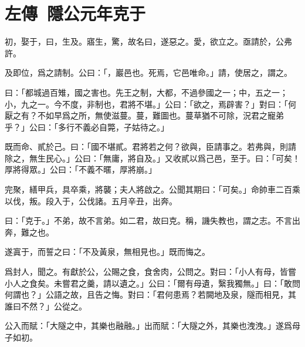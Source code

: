 \section[鄭伯克段于鄢\quad{\small 左傳\ 隱公元年}]{{\normalsize 左傳\ 隱公元年}\quad {}克于}
初，娶于，曰，生及。寤生，驚，故名曰，遂惡之。愛，欲立之。亟請於，公弗許。

及即位，爲之請制。公曰：「，巖邑也。死焉，它邑唯命。」請，使居之，謂之。

曰：「都城過百雉，國之害也。先王之制，大都，不過參國之一；中，五之一；小，九之一。今不度，非制也，君將不堪。」公曰：「欲之，焉辟害？」對曰：「何厭之有？不如早爲之所，無使滋蔓。蔓，難圖也。蔓草猶不可除，況君之寵弟乎？」公曰：「多行不義必自斃，子姑待之。」

既而命、貳於己。曰：「國不堪貳。君將若之何？欲與，臣請事之。若弗與，則請除之，無生民心。」公曰：「無庸，將自及。」又收貳以爲己邑，至于。曰：「可矣！厚將得眾。」公曰：「不義不暱，厚將崩。」

完聚，繕甲兵，具卒乘，將襲；夫人將啟之。公聞其期曰：「可矣。」命帥車二百乘以伐，叛。段入于，公伐諸。五月辛丑，出奔。

曰：「克于。」不弟，故不言弟。如二君，故曰克。稱，譏失教也，謂之志。不言出奔，難之也。

遂寘于，而誓之曰：「不及黃泉，無相見也。」既而悔之。

爲封人，聞之。有獻於公，公賜之食，食舍肉，公問之。對曰：「小人有母，皆嘗小人之食矣。未嘗君之羹，請以遺之。」公曰：「爾有母遺，繄我獨無。」曰：「敢問何謂也？」公語之故，且告之悔。對曰：「君何患焉？若闕地及泉，隧而相見，其誰曰不然？」公從之。

公入而賦：「大隧之中，其樂也融融。」出而賦：「大隧之外，其樂也洩洩。」遂爲母子如初。

